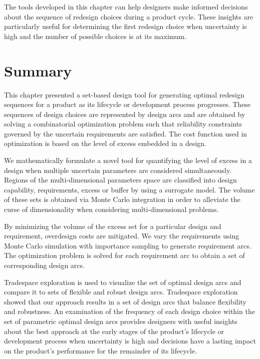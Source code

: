 The tools developed in this chapter can help designers make informed decisions about the sequence of redesign choices during a product cycle. These insights are particularly useful for determining the first redesign choice when uncertainty is high and the number of possible choices is at its maximum.

\section{Summary}
\label{sec:TSEcontsummary}

This chapter presented a set-based design tool for generating optimal redesign sequences for a product as its lifecycle or development process progresses. These sequences of design choices are represented by design arcs and are obtained by solving a combinatorial optimization problem such that reliability constraints governed by the uncertain requirements are satisfied. The cost function used in optimization is based on the level of excess embedded in a design. 

We mathematically formulate a novel tool for quantifying the level of excess in a design when multiple uncertain parameters are considered simultaneously. Regions of the multi-dimensional parameters space are classified into design capability, requirements, excess or buffer by using a surrogate model. The volume of these sets is obtained via Monte Carlo integration in order to alleviate the curse of dimensionality when considering multi-dimensional problems.

By minimizing the volume of the excess set for a particular design and requirement, overdesign costs are mitigated. We vary the requirements using Monte Carlo simulation with importance sampling to generate requirement arcs. The optimization problem is solved for each requirement arc to obtain a set of corresponding design arcs. 

Tradespace exploration is used to visualize the set of optimal design arcs and compare it to sets of flexible and robust design arcs. Tradespace exploration showed that our approach results in a set of design arcs that balance flexibility and robustness. An examination of the frequency of each design choice within the set of parametric optimal design arcs provides designers with useful insights about the best approach at the early stages of the product's lifecycle or development process when uncertainty is high and decisions have a lasting impact on the product's performance for the remainder of its lifecycle.


